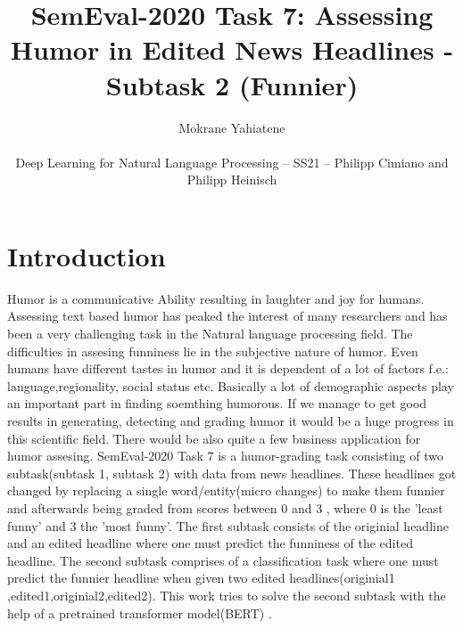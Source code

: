 \documentclass[11pt,a4paper,onecolumn,oneside,notitlepage]{article}
\author{Mokrane Yahiatene\\
	\begin{small}
		Deep Learning for Natural Language Processing -- SS21 -- Philipp Cimiano and Philipp Heinisch
	\end{small}
}
\title{SemEval-2020 Task 7: Assessing Humor in Edited
	News Headlines - Subtask 2 (Funnier)}
\begin{document}
	\maketitle
	
	\section{Introduction}
		Humor is a communicative Ability resulting in laughter and joy for humans. Assessing text based humor has peaked the interest of many researchers and has been a very challenging task in the Natural language processing field.
		The difficulties in assesing funniness lie in the subjective nature of humor. Even humans have different tastes in humor and it is dependent of a lot of factors  f.e.: language,regionality, social status etc.
		Basically a lot of demographic aspects play an important part in finding soemthing humorous.
		If we manage to get good results in generating, detecting and grading humor it would be a huge progress in this scientific field. There would be also quite a few business application for humor assesing.
		SemEval-2020 Task 7 is a humor-grading task consisting of two subtask(subtask 1, subtask 2) with data from news headlines. These headlines got changed by replacing a single word/entity(micro changes) to make them funnier and afterwards being graded from scores between 0 and 3 , where 0 is the 'least funny' and 3 the 'most funny'.
		The first subtask consists of the originial headline and an edited headline where one must predict the funniness of the edited headline.
		The second subtask comprises of a classification task where one must predict the funnier headline when given two edited headlines(originial1 ,edited1,originial2,edited2).
		This work tries to solve the second subtask with the help of a pretrained transformer model(BERT) .
		
		
\end{document}
